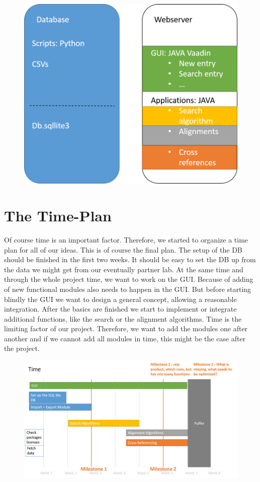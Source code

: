 \documentclass[]{article}
\begin{document}
	\begin{figure}[h]
		\includegraphics[width=\textwidth]{../img/Structure.png}
	\end{figure}

\section{ The Time-Plan}
Of course time is an important factor. Therefore, we started to organize a time plan for all of our ideas. This is of course the final plan. The setup of the DB should be finished in the first two weeks. It should be easy to set the DB up from the data we might get from our eventually partner lab. At the same time and through the whole project time, we want to work on the GUI. Because of adding of new functional modules also needs to happen in the GUI. But before starting blindly the GUI we want to design a general concept, allowing a reasonable integration. After the basics are finished we start to implement or integrate additional functions, like the search or the alignment algorithms. Time is the limiting factor of our project. Therefore, we want to add the modules one after another and if we cannot add all modules in time, this might be the case after the project.
  
	\begin{figure}[h]
		\includegraphics[width=\textwidth]{../img/Time.png}
	\end{figure}
\end{document}
